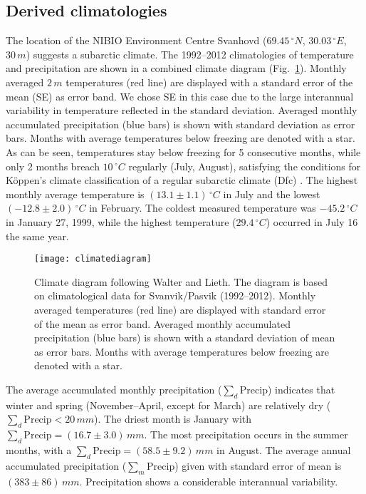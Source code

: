 \documentclass[bg, manuscript]{copernicus}
\begin{document}
\subsection{Derived climatologies}
\label{subsec:climatologies}

The location of the NIBIO Environment Centre Svanhovd ($69.45\,\unit{^\circ N}$, $30.03\,\unit{^\circ E}$, $30\,\unit{m}$) suggests a subarctic climate. The 1992--2012 climatologies of temperature and precipitation are shown in a combined climate diagram (Fig.~\ref{fig:climatediagram}). Monthly averaged $2\,\unit{m}$ temperatures (red line) are displayed with a standard error of the mean (SE) as error band. We chose SE in this case due to the large interannual variability in temperature reflected in the standard deviation. Averaged monthly accumulated precipitation (blue bars) is shown with standard deviation as error bars. Months with average temperatures below freezing are denoted with a star. As can be seen, temperatures stay below freezing for 5 consecutive months, while only 2 months breach $10\,\unit{^\circ C}$ regularly (July, August), satisfying the conditions for K\"{o}ppen's climate classification of a regular subarctic climate (Dfc) \citep[e.g.][]{SD:Beck2018}. The highest monthly average temperature is $(13.1\pm 1.1)\,\unit{^\circ C}$ in July and the lowest $(-12.8\pm 2.0)\,\unit{^\circ C}$ in February. The coldest measured temperature was $-45.2\,\unit{^\circ C}$ in January 27, 1999, while the highest temperature ($29.4\,\unit{^\circ C}$) occurred in July 16 the same year.

\begin{figure}[t]
  \texttt{[image: climatediagram]}
  \caption{Climate diagram following Walter and Lieth. The diagram is based on climatological data for Svanvik/Pasvik (1992--2012). Monthly averaged temperatures (red line) are displayed with standard error of the mean as error band. Averaged monthly accumulated precipitation (blue bars) is shown with a standard deviation of mean as error bars. Months with average temperatures below freezing are denoted with a star.}
  \label{fig:climatediagram}
\end{figure}

The average accumulated monthly precipitation ($\sum_d\mathrm{Precip}$) indicates that winter and spring (November--April, except for March) are relatively dry ($\sum_d\mathrm{Precip} < 20\,\unit{mm}$). The driest month is January with $\sum_d\mathrm{Precip} = (16.7\pm 3.0)\,\unit{mm}$. The most precipitation occurs in the summer months, with a $\sum_d\mathrm{Precip} = (58.5\pm 9.2)\,\unit{mm}$ in August. The average annual accumulated precipitation ($\sum_m\mathrm{Precip}$) given with standard error of mean is $(383\pm 86)\,\unit{mm}$. Precipitation shows a considerable interannual variability.
\end{document}
